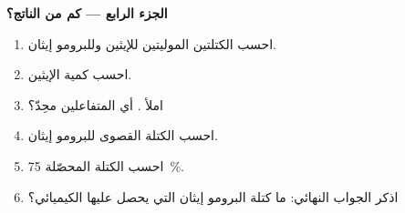 \begin{problem}
\medskip
\noindent\textbf{الجزء الرابع --- كم من الناتج؟}
\begin{enumerate}[resume]
  \item احسب الكتلتين الموليتين للإيثين وللبرومو إيثان.
  \item احسب كمية الإيثين.
  \item املأ . أي المتفاعلين محِدّ؟
  \item احسب الكتلة القصوى للبرومو إيثان.
  \item احسب الكتلة المحصّلة  \qty{75}{\percent}.
  \item اذكر الجواب النهائي: ما كتلة البرومو إيثان التي يحصل عليها
        الكيميائي؟
\end{enumerate}
\end{problem}
